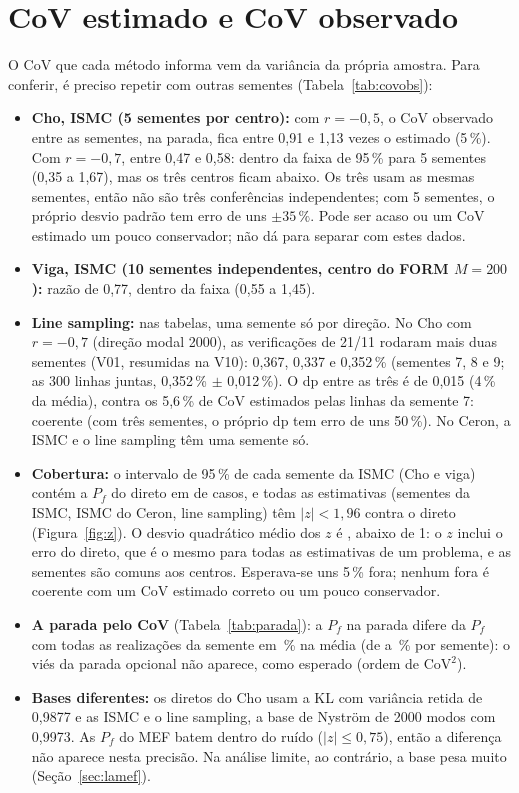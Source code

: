 \documentclass[11pt,a4paper]{article}
\begin{document}
\section{CoV estimado e CoV observado}\label{sec:covobs}
O CoV que cada método informa vem da variância da própria amostra. Para conferir, é preciso repetir com outras sementes
(Tabela~\ref{tab:covobs}):
\begin{itemize}
  \item \textbf{Cho, ISMC (5 sementes por centro):} com $r = -0{,}5$, o CoV observado entre as sementes, na parada, fica
    entre 0,91 e 1,13 vezes o estimado (5\,\%). Com $r = -0{,}7$, entre 0,47 e 0,58: dentro da faixa de 95\,\% para 5
    sementes (0,35 a 1,67), mas os três centros ficam abaixo. Os três usam as mesmas sementes, então não são três
    conferências independentes; com 5 sementes, o próprio desvio padrão tem erro de uns $\pm 35\,\%$. Pode ser acaso ou
    um CoV estimado um pouco conservador; não dá para separar com estes dados.
  \item \textbf{Viga, ISMC (10 sementes independentes, centro do FORM $M = 200$):} razão de 0,77, dentro da faixa
    (0,55 a 1,45).
  \item \textbf{Line sampling:} nas tabelas, uma semente só por direção. No Cho com $r = -0{,}7$ (direção modal 2000),
    as verificações de 21/11 rodaram mais duas sementes (V01, resumidas na V10): 0,367, 0,337 e 0,352\,\% (sementes 7, 8 e 9; as 300
    linhas juntas, 0,352\,\% $\pm$ 0,012\,\%). O dp entre as três é de 0,015 (4\,\% da média), contra os 5,6\,\% de CoV
    estimados pelas linhas da semente 7: coerente (com três sementes, o próprio dp tem erro de uns 50\,\%). No Ceron,
    a ISMC e o line sampling têm uma semente só.
  \item \textbf{Cobertura:} o intervalo de 95\,\% de cada semente da ISMC (Cho e viga) contém a $P_f$ do direto em
    \icDentro{} de \icTotal{} casos, e todas as \zTotal{} estimativas (sementes da ISMC, ISMC do Ceron, line sampling)
    têm $|z| < 1{,}96$ contra o direto (Figura~\ref{fig:z}). O desvio quadrático médio dos $z$ é \zSd, abaixo de 1: o
    $z$ inclui o erro do direto, que é o mesmo para todas as estimativas de um problema, e as sementes são comuns aos
    centros. Esperava-se uns 5\,\% fora; nenhum fora é coerente com um CoV estimado correto ou um pouco conservador.
  \item \textbf{A parada pelo CoV} (Tabela~\ref{tab:parada}): a $P_f$ na parada difere da $P_f$ com todas as realizações
    da semente em \viesParada\,\% na média (de \viesParadaMin{} a \viesParadaMax\,\% por semente): o viés da parada
    opcional não aparece, como esperado (ordem de $\mathrm{CoV}^2$).
  \item \textbf{Bases diferentes:} os diretos do Cho usam a KL com variância retida de 0,9877 e as ISMC e o line
    sampling, a base de Nyström de 2000 modos com 0,9973. As $P_f$ do MEF batem dentro do ruído ($|z| \le 0{,}75$),
    então a diferença não aparece nesta precisão. Na análise limite, ao contrário, a base pesa muito
    (Seção~\ref{sec:lamef}).
\end{itemize}
\end{document}
